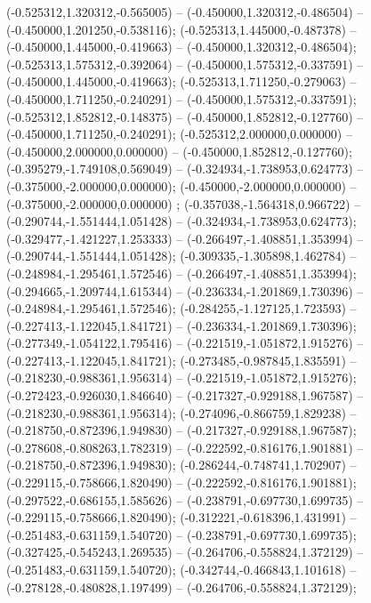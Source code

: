  (-0.525312,1.320312,-0.565005) -- (-0.450000,1.320312,-0.486504) -- (-0.450000,1.201250,-0.538116);
 (-0.525313,1.445000,-0.487378) -- (-0.450000,1.445000,-0.419663) -- (-0.450000,1.320312,-0.486504);
 (-0.525313,1.575312,-0.392064) -- (-0.450000,1.575312,-0.337591) -- (-0.450000,1.445000,-0.419663);
 (-0.525313,1.711250,-0.279063) -- (-0.450000,1.711250,-0.240291) -- (-0.450000,1.575312,-0.337591);
 (-0.525312,1.852812,-0.148375) -- (-0.450000,1.852812,-0.127760) -- (-0.450000,1.711250,-0.240291);
 (-0.525312,2.000000,0.000000) -- (-0.450000,2.000000,0.000000) -- (-0.450000,1.852812,-0.127760);
 (-0.395279,-1.749108,0.569049) -- (-0.324934,-1.738953,0.624773) -- (-0.375000,-2.000000,0.000000);
 (-0.450000,-2.000000,0.000000) -- (-0.375000,-2.000000,0.000000) ;
 (-0.357038,-1.564318,0.966722) -- (-0.290744,-1.551444,1.051428) -- (-0.324934,-1.738953,0.624773);
 (-0.329477,-1.421227,1.253333) -- (-0.266497,-1.408851,1.353994) -- (-0.290744,-1.551444,1.051428);
 (-0.309335,-1.305898,1.462784) -- (-0.248984,-1.295461,1.572546) -- (-0.266497,-1.408851,1.353994);
 (-0.294665,-1.209744,1.615344) -- (-0.236334,-1.201869,1.730396) -- (-0.248984,-1.295461,1.572546);
 (-0.284255,-1.127125,1.723593) -- (-0.227413,-1.122045,1.841721) -- (-0.236334,-1.201869,1.730396);
 (-0.277349,-1.054122,1.795416) -- (-0.221519,-1.051872,1.915276) -- (-0.227413,-1.122045,1.841721);
 (-0.273485,-0.987845,1.835591) -- (-0.218230,-0.988361,1.956314) -- (-0.221519,-1.051872,1.915276);
 (-0.272423,-0.926030,1.846640) -- (-0.217327,-0.929188,1.967587) -- (-0.218230,-0.988361,1.956314);
 (-0.274096,-0.866759,1.829238) -- (-0.218750,-0.872396,1.949830) -- (-0.217327,-0.929188,1.967587);
 (-0.278608,-0.808263,1.782319) -- (-0.222592,-0.816176,1.901881) -- (-0.218750,-0.872396,1.949830);
 (-0.286244,-0.748741,1.702907) -- (-0.229115,-0.758666,1.820490) -- (-0.222592,-0.816176,1.901881);
 (-0.297522,-0.686155,1.585626) -- (-0.238791,-0.697730,1.699735) -- (-0.229115,-0.758666,1.820490);
 (-0.312221,-0.618396,1.431991) -- (-0.251483,-0.631159,1.540720) -- (-0.238791,-0.697730,1.699735);
 (-0.327425,-0.545243,1.269535) -- (-0.264706,-0.558824,1.372129) -- (-0.251483,-0.631159,1.540720);
 (-0.342744,-0.466843,1.101618) -- (-0.278128,-0.480828,1.197499) -- (-0.264706,-0.558824,1.372129);
